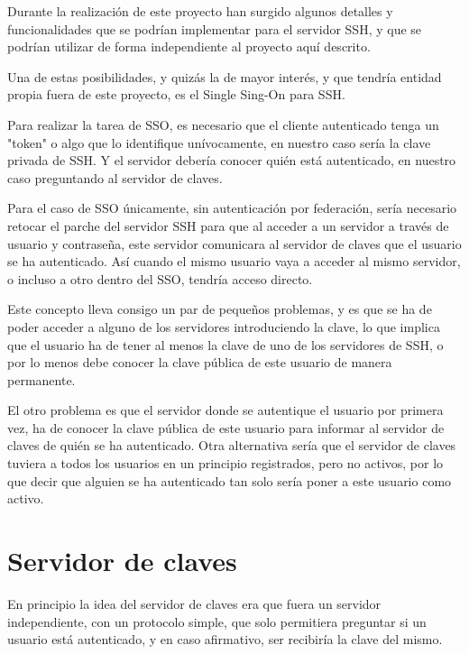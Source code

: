         Durante la realización de este proyecto han surgido algunos
        detalles y funcionalidades que se podrían implementar para el
        servidor SSH, y que se podrían utilizar de forma independiente al
        proyecto aquí descrito.

        Una de estas posibilidades, y quizás la de mayor interés, y que
        tendría entidad propia fuera de este proyecto, es el Single Sing-On
        para SSH.

        Para realizar la tarea de SSO, es necesario que el cliente
        autenticado tenga un "token" o algo que lo identifique
        unívocamente, en nuestro caso sería la clave privada de SSH. Y el
        servidor debería conocer quién está autenticado, en nuestro caso
        preguntando al servidor de claves.

        Para el caso de SSO únicamente, sin autenticación por federación,
        sería necesario retocar el parche del servidor SSH para que al
        acceder a un servidor a través de usuario y contraseña, este
        servidor comunicara al servidor de claves que el usuario se ha
        autenticado. Así cuando el mismo usuario vaya a acceder al mismo
        servidor, o incluso a otro dentro del SSO, tendría acceso directo.

        Este concepto lleva consigo un par de pequeños problemas, y es que
        se ha de poder acceder a alguno de los servidores introduciendo la
        clave, lo que implica que el usuario ha de tener al menos la clave
        de uno de los servidores de SSH, o por lo menos debe conocer la
        clave pública de este usuario de manera permanente.

        El otro problema es que el servidor donde se autentique el usuario
        por primera vez, ha de conocer la clave pública de este usuario
        para informar al servidor de claves de quién se ha autenticado.
        Otra alternativa sería que el servidor de claves tuviera a todos
        los usuarios en un principio registrados, pero no activos, por lo
        que decir que alguien se ha autenticado tan solo sería poner a este
        usuario como activo.
    
    \section{Servidor de claves}

    En principio la idea del servidor de claves era que fuera un servidor
    independiente, con un protocolo simple, que solo permitiera preguntar
    si un usuario está autenticado, y en caso afirmativo, ser recibiría la
    clave del mismo.

